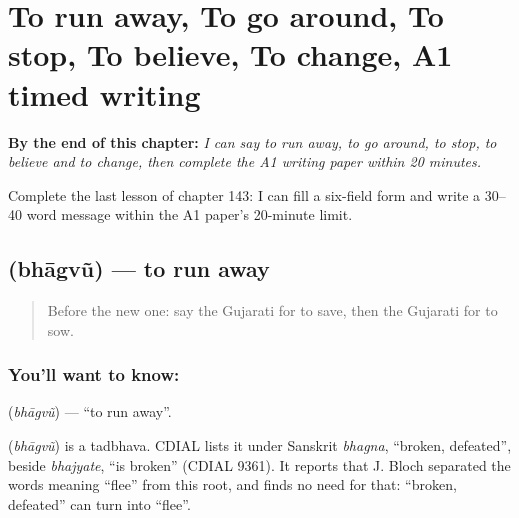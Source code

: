 
\chapter{To run away, To go around, To stop, To believe, To change, A1 timed writing}
\label{ch:gu-to-run-away-to-go-around-to-stop-to-believe-to-change}

\begin{chapteropening}
\textbf{By the end of this chapter:} \emph{I can say to run away, to go around, to stop, to believe and to change, then complete the A1 writing paper within 20 minutes.}

Complete the last lesson of chapter 143: I can fill a six-field form and write a 30–40 word message within the A1 paper's 20-minute limit.
\end{chapteropening}

\section[\texorpdfstring{\gu{ભાગવું} (bhāgvũ)}{ભાગવું (bhāgvũ)}]{ (bhāgvũ) — to run away}

\label{lesson:GU-C143-bhagvu}



\begin{quote}
Before the new one: say the Gujarati for to save, then the Gujarati for to sow.
\end{quote}

\subsection*{You'll want to know: }
\textbf{} (\emph{bhāgvũ}) — \textquotedblleft{}to run away\textquotedblright{}.

\begin{cousinweb}
\textbf{} (\emph{bhāgvũ}) is a tadbhava. CDIAL lists it under Sanskrit \emph{bhagna}, \textquotedblleft{}broken, defeated\textquotedblright{}, beside \emph{bhajyate}, \textquotedblleft{}is broken\textquotedblright{} (CDIAL 9361). It reports that J. Bloch separated the words meaning \textquotedblleft{}flee\textquotedblright{} from this root, and finds no need for that: \textquotedblleft{}broken, defeated\textquotedblright{} can turn into \textquotedblleft{}flee\textquotedblright{}.
\end{cousinweb}

